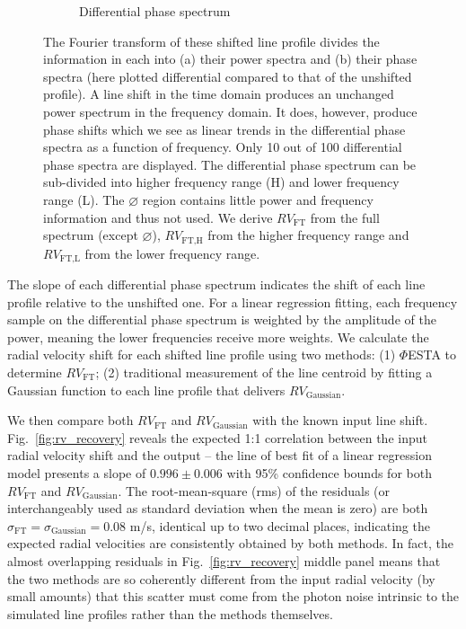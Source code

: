 \begin{figure}[tbp]
\begin{subfigure}[b]{0.49\textwidth}
        \caption{Differential phase spectrum}
        \label{fig:dps}
    \end{subfigure}	
    \caption[Fourier transform of 100 shifted line profiles]
    {The Fourier transform of these shifted line profile divides the information in each into (a) their power spectra and (b) their phase spectra (here plotted differential compared to that of the unshifted profile). A line shift in the time domain produces an unchanged power spectrum in the frequency domain. It does, however, produce phase shifts which we see as linear trends in the differential phase spectra as a function of frequency. Only 10 out of 100 differential phase spectra are displayed. The differential phase spectrum can be sub-divided into higher frequency range (H) and lower frequency range (L). The $\varnothing$ region contains little power and frequency information and thus not used. We derive $RV_\text{FT}$ from the full spectrum (except $\varnothing$), $RV_\text{FT,H}$ from the higher frequency range and $RV_\text{FT,L}$ from the lower frequency range.}
\label{fig:FT_process}
\end{figure}    

The slope of each differential phase spectrum indicates the shift of each line profile relative to the unshifted one. For a linear regression fitting, each frequency sample on the differential phase spectrum is weighted by the amplitude of the power, meaning the lower frequencies receive more weights. We calculate the radial velocity shift for each shifted line profile using two methods: (1) $\mathit{\Phi}$ESTA to determine $RV_\text{FT}$; (2) traditional measurement of the line centroid by fitting a Gaussian function to each line profile that delivers $RV_\text{Gaussian}$. 

We then compare both $RV_\text{FT}$ and $RV_\text{Gaussian}$ with the known input line shift. Fig.~\ref{fig:rv_recovery} reveals the expected 1:1 correlation between the input radial velocity shift and the output -- the line of best fit of a linear regression model presents a slope of $0.996\pm0.006$ with 95\% confidence bounds for both $RV_\text{FT}$ and $RV_\text{Gaussian}$. The root-mean-square (rms) of the residuals (or interchangeably used as standard deviation when the mean is zero) are both $\sigma_\text{FT} = \sigma_\text{Gaussian} = 0.08$ m/s, identical up to two decimal places, indicating the expected radial velocities are consistently obtained by both methods. In fact, the almost overlapping residuals in Fig.~\ref{fig:rv_recovery} middle panel means that the two methods are so coherently different from the input radial velocity (by small amounts) that this scatter must come from the photon noise intrinsic to the simulated line profiles rather than the methods themselves. 

